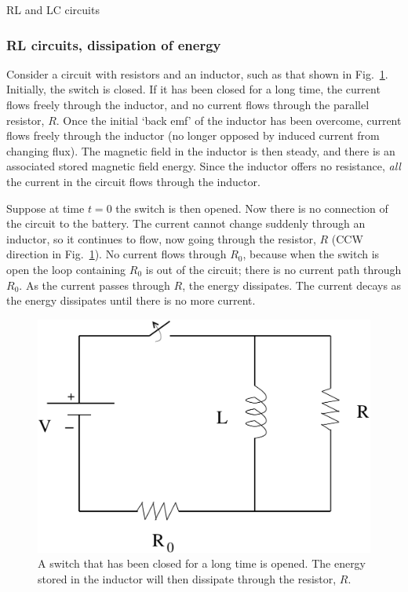 \documentclass[12pt]{article}
\begin{document}
\begin{flushright} {\color{blue} RL and LC circuits} \end{flushright}

\begin{flushleft}

\subsubsection*{RL circuits, dissipation of energy}

Consider a circuit with resistors and an inductor, such as that shown in Fig.~\ref{fig:rlcircuit}.  Initially, the switch is closed.  If it has been closed for a long time, the current flows freely through the inductor, and no current flows through the parallel resistor, $R$.  Once the initial `back emf' of the inductor has been overcome, current flows freely through the inductor (no longer opposed by induced current from changing flux).  The magnetic field in the inductor is then steady, and there is an associated stored magnetic field energy.  Since the inductor offers no resistance, {\it all} the current in the circuit flows through the inductor.

Suppose at time $t=0$ the switch is then opened.  Now there is no connection of the circuit to the battery.  The current cannot change suddenly through an inductor, so it continues to flow, now going through the resistor, $R$ (CCW direction in Fig.~\ref{fig:rlcircuit}).  No current flows through $R_{0}$, because when the switch is open the loop containing $R_{0}$ is out of the circuit; there is no current path through $R_{0}$.  As the current passes through $R$, the energy dissipates.  The current decays as the energy dissipates until there is no more current.

\begin{figure}[h]
\centering
\includegraphics*[trim=0cm 0cm 0cm 0cm, clip=true, width=0.4\columnwidth]{simplr3.pdf}
\caption{\small A switch that has been closed for a long time is opened.  The energy stored in the inductor will then dissipate through the resistor, $R$.}
\label{fig:rlcircuit}
\end{figure}


\end{flushleft}
\end{document}
